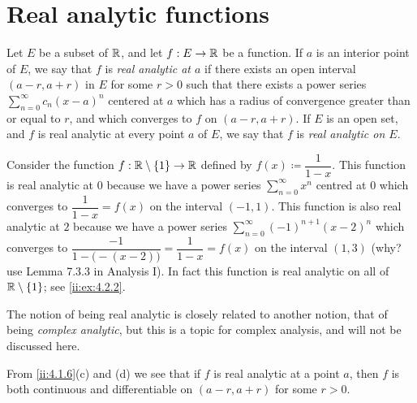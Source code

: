 \section{Real analytic functions}\label{ii:sec:4.2}

\begin{defn}\label{ii:4.2.1}
  Let \(E\) be a subset of \(\mathbb{R}\), and let \(f : E \to \mathbb{R}\) be a function.
  If \(a\) is an interior point of \(E\), we say that \(f\) is \emph{real analytic at \(a\)} if there exists an open interval \((a - r, a + r)\) in \(E\) for some \(r > 0\) such that there exists a power series \(\sum_{n = 0}^\infty c_n (x - a)^n\) centered at \(a\) which has a radius of convergence greater than or equal to \(r\), and which converges to \(f\) on \((a - r, a + r)\).
  If \(E\) is an open set, and \(f\) is real analytic at every point \(a\) of \(E\), we say that \(f\) is \emph{real analytic on \(E\)}.
\end{defn}

\begin{eg}\label{ii:4.2.2}
  Consider the function \(f : \mathbb{R} \setminus \left\lbrace1\right\rbrace \to \mathbb{R}\) defined by \(f(x) \coloneqq \dfrac{1}{1 - x}\).
  This function is real analytic at \(0\) because we have a power series \(\sum_{n = 0}^\infty x^n\) centred at \(0\) which converges to \(\dfrac{1}{1 - x} = f(x)\) on the interval \((-1, 1)\).
  This function is also real analytic at \(2\) because we have a power series \(\sum_{n = 0}^\infty (-1)^{n + 1} (x - 2)^n\) which converges to \(\dfrac{-1}{1 - \big(-(x - 2)\big)} = \dfrac{1}{1 - x} = f(x)\) on the interval \((1, 3)\)
  (why? use Lemma 7.3.3 in Analysis I).
  In fact this function is real analytic on all of \(\mathbb{R} \setminus \left\lbrace1\right\rbrace\);
  see \cref{ii:ex:4.2.2}.
\end{eg}

\begin{rmk}\label{ii:4.2.3}
  The notion of being real analytic is closely related to another notion, that of being \emph{complex analytic}, but this is a topic for complex analysis, and will not be discussed here.
\end{rmk}

\begin{note}
  From \cref{ii:4.1.6}(c) and (d) we see that if \(f\) is real analytic at a point \(a\), then \(f\) is both continuous and diﬀerentiable on \((a - r, a + r)\) for some \(r > 0\).
\end{note}

